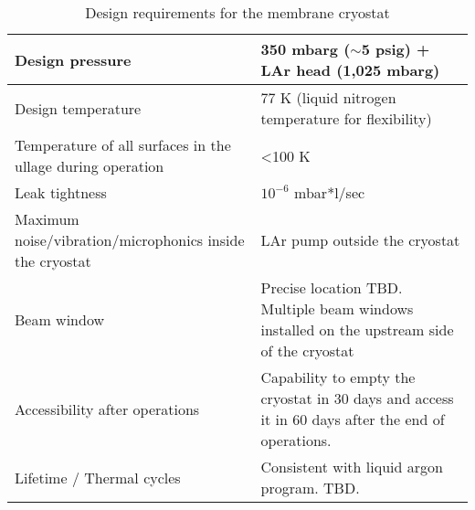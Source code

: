 \begin{table}[htpb]
\begin{tabular}{|p{}|p{}|}
 Design pressure  &  350 mbarg ($\sim$5 psig) + LAr head (1,025 mbarg) \\ \hline
Design temperature   &  77 K (liquid nitrogen temperature for flexibility) \\ \hline
Temperature of all surfaces in the ullage during operation   & \textless 100 K  \\ \hline
Leak tightness   & $10^{-6}$ mbar*l/sec   \\ \hline
Maximum noise/vibration/microphonics inside the cryostat   & LAr pump outside the cryostat  \\ \hline
Beam window   & Precise location TBD. Multiple beam windows installed on the upstream side of the cryostat  \\ \hline
 Accessibility after operations  & Capability to empty the cryostat in 30 days and access it in 60 days after the end of operations. \\ \hline
  Lifetime / Thermal cycles &  Consistent with liquid argon program. TBD. \\ \hline
 \end{tabular}
\caption{Design requirements for the membrane cryostat}
\label{tbl:cryogenics-design-parameters}
\end{table}




